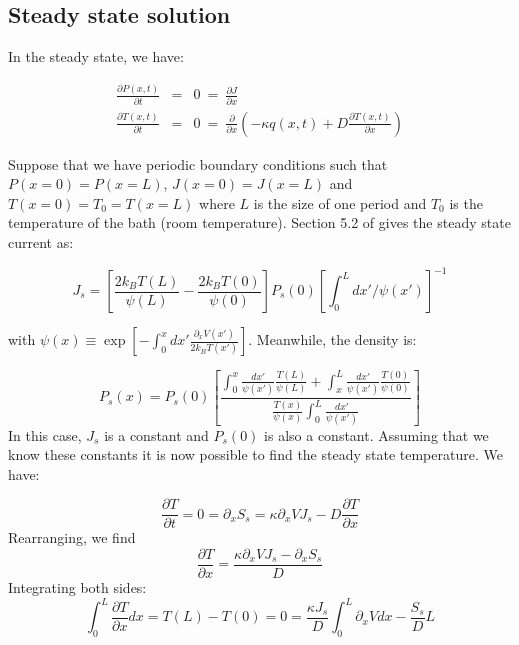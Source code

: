 \documentclass[11pt]{article} %
\begin{document}
\subsection{Steady state solution} \label{SteadyState}
In the steady state, we have:

\begin{eqnarray}
\frac{\partial P(x, t)}{\partial t} &=&  0 \ = \ \frac{\partial J}{\partial x} \label{eqn:SmoluchowskiSteady} \\
\frac{\partial T(x, t)}{\partial t} &=& 0 \ = \ \frac{\partial}{\partial x} \left ( -\kappa q(x, t) + D \frac{\partial T(x, t)}{\partial x} \right ) \label{eqn:TemperatureSteady}
\end{eqnarray}

Suppose that we have periodic boundary conditions such that $P(x = 0) = P(x = L)$,  $J(x = 0) = J(x = L)$ and $T(x = 0) = T_0 = T(x = L)$ where $L$ is the size of one period and $T_0$ is the temperature of the bath (room temperature). Section 5.2 of \cite{Gardiner2009} gives the steady state current as:

\begin{equation}
J_s = \left [\frac{2 k_B T(L)}{\psi(L)} - \frac{2 k_B T(0)}{\psi(0)}  \right] P_s(0) \left [\int_0^L dx'/\psi(x') \right]^{-1}
\label{eqn:SteadyCurrent}
\end{equation}

with $\psi(x) \equiv \exp[-\int_0^x dx' \frac{\partial_x V(x')}{2 k_B T(x')}]$. Meanwhile, the density is:

\begin{equation}
P_s(x) = P_s(0) \left [\frac{\int_0^x \frac{dx'}{\psi(x')} \frac{T(L)}{\psi(L)} + \int_x^L \frac{dx'}{\psi(x')} \frac{T(0)}{\psi(0)} }{\frac{T(x)}{\psi(x)} \int_0^L \frac{dx'}{\psi(x')} } \right]
\label{eqn:SteadyDensity}
\end{equation}
In this case, $J_s$ is a constant and $P_s(0)$ is also a constant. Assuming that we know these constants it is now possible to find the steady state temperature. We have:

\begin{equation}
\frac{\partial T}{\partial t} = 0 =  \partial_x S_s = \kappa \partial_x V J_s - D \frac{\partial T}{\partial x}
\end{equation}
Rearranging, we find
\begin{equation}
\frac{\partial T}{\partial x} = \frac{\kappa \partial_x V J_s - \partial_x S_s}{D}
\end{equation}
Integrating both sides:
\begin{equation}
\int_0^L \frac{\partial T}{\partial x} dx = T(L) - T(0) = 0 = \frac{\kappa J_s}{D} \int_0^L \partial_x V dx - \frac{S_s}{D}L
\end{equation}
\end{document}
